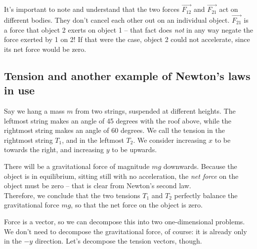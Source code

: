 It's important to note and understand that the two forces $\vec{F_{12}}$ and $\vec{F_{21}}$ act on different bodies. They don't cancel each other out on an individual object. $\vec{F_{21}}$ is a force that object 2 exerts on object 1 -- that fact does \emph{not} in any way negate the force exerted by 1 on 2! If that were the case, object 2 could not accelerate, since its net force would be zero.


\subsection{Tension and another example of Newton's laws in use}

Say we hang a mass $m$ from two strings, suspended at different heights. The leftmost string makes an angle of 45 degrees with the roof above, while the rightmost string makes an angle of 60 degrees. We call the tension in the rightmost string $T_1$, and in the leftmost $T_2$. We consider increasing $x$ to be towards the right, and increasing $y$ to be upwards.

\begin{figure}[H]
     \centering
{}
\end{figure}


There will be a gravitational force of magnitude $m g$ downwards. Because the object is in equilibrium, sitting still with no acceleration, the \emph{net force} on the object must be zero -- that is clear from Newton's second law.\\
Therefore, we conclude that the two tensions $T_1$ and $T_2$ perfectly balance the gravitational force $m g$, so that the net force on the object is zero.

Force is a vector, so we can decompose this into two one-dimensional problems. We don't need to decompose the gravitational force, of course: it is already only in the $-y$ direction. Let's decompose the tension vectors, though.

